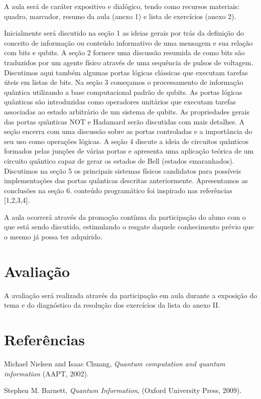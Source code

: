 \documentclass{article}
\begin{document}
A aula será de caráter expositivo e dialógico, tendo como recursos materiais: quadro, marcador, resumo da aula (anexo 1) e lista de exercícios (anexo 2).

Inicialmente será discutido na seção 1 as ideias gerais por trás da definição do conceito de informação ou conteúdo informativo de uma mensagem e sua relação com bits e qubits. A seção 2 fornece uma discussão resumida de como bits são traduzidos por um agente físico através de uma sequência de pulsos de voltagem. Discutimos aqui também algumas portas lógicas clássicas que executam tarefas úteis em listas de bits. Na seção 3 começamos o processamento de informação quântica utilizando a base computacional padrão de qubits. As portas lógicas quânticas são introduzidas como operadores unitários que executam tarefas associadas ao estado arbitrário de um sistema de qubits. As propriedades gerais das portas quânticas NOT e Hadamard serão discutidas com mais detalhes. A seção encerra com uma discussão sobre as portas controladas e a importância do seu uso como operações lógicas. A seção 4 discute a ideia de circuitos quânticos formados pelas junções de várias portas e apresenta uma aplicação teórica de um circuito quântico capaz de gerar os estados de Bell (estados emaranhados). Discutimos na seção 5 os principais sistemas físicos candidatos para possíveis implementações das portas quânticas descritas anteriormente. Apresentamos as conclusões na seção 6.  conteúdo programático foi inspirado nas referências [1,2,3,4].

A aula ocorrerá através da promoção contínua da participação do aluno com o que está sendo discutido, estimulando o resgate daquele conhecimento prévio que o mesmo já possa ter adquirido.

\section{Avaliação}

A avaliação será realizada através da participação em aula durante a exposição do tema e do diagnóstico da resolução dos exercícios da lista do anexo II. 

\section{Referências}

\noindent [1] Michael Nielsen and Isaac Chuang, \textit{Quantum computation and quantum information} (AAPT, 2002).

\noindent [2] Stephen M. Barnett, \textit{Quantum Information}, (Oxford University Press, 2009).
\end{document}
